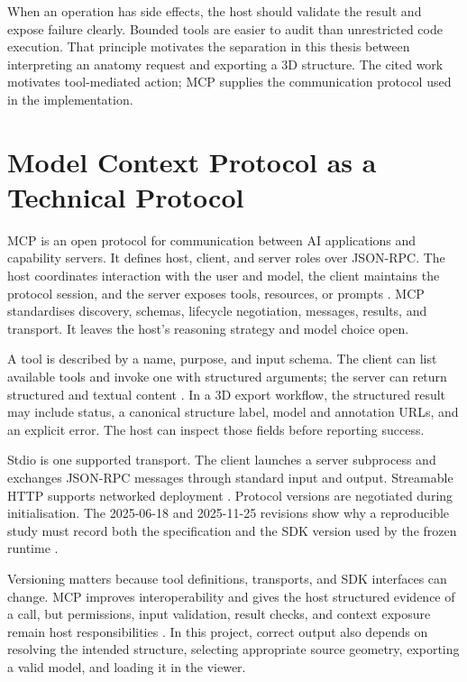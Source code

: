 When an operation has side effects, the host should validate the result and expose failure clearly. Bounded tools are easier to audit than unrestricted code execution. That principle motivates the separation in this thesis between interpreting an anatomy request and exporting a 3D structure. The cited work motivates tool-mediated action; MCP supplies the communication protocol used in the implementation.

\section{Model Context Protocol as a Technical Protocol}
\label{sec:mcp-background}

MCP is an open protocol for communication between AI applications and capability servers. It defines host, client, and server roles over JSON-RPC. The host coordinates interaction with the user and model, the client maintains the protocol session, and the server exposes tools, resources, or prompts \parencite{mcp20251125}. MCP standardises discovery, schemas, lifecycle negotiation, messages, results, and transport. It leaves the host's reasoning strategy and model choice open.

A tool is described by a name, purpose, and input schema. The client can list available tools and invoke one with structured arguments; the server can return structured and textual content \parencite{mcp20251125}. In a 3D export workflow, the structured result may include status, a canonical structure label, model and annotation URLs, and an explicit error. The host can inspect those fields before reporting success.

Stdio is one supported transport. The client launches a server subprocess and exchanges JSON-RPC messages through standard input and output. Streamable HTTP supports networked deployment \parencite{mcp20251125}. Protocol versions are negotiated during initialisation. The 2025-06-18 and 2025-11-25 revisions show why a reproducible study must record both the specification and the SDK version used by the frozen runtime \parencite{mcp20250618,mcp20251125}.

Versioning matters because tool definitions, transports, and SDK interfaces can change. MCP improves interoperability and gives the host structured evidence of a call, but permissions, input validation, result checks, and context exposure remain host responsibilities \parencite{mcp20251125}. In this project, correct output also depends on resolving the intended structure, selecting appropriate source geometry, exporting a valid model, and loading it in the viewer.

